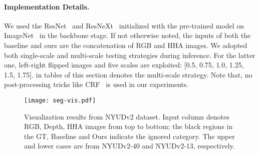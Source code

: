 \vspace{-0.6cm}
\paragraph{Implementation Details.} We used the ResNet~\cite{he2016deep} and ResNeXt~\cite{xie2017aggregated} initialized with the pre-trained model on ImageNet~\cite{russakovsky2015imagenet} in the backbone stage. If not otherwise noted, the inputs of both the baseline and ours are the concatenation of RGB and HHA images. We adopted both single-scale and multi-scale testing strategies during inference. For the latter one, left-right flipped images and five scales are exploited: [0.5, 0.75, 1.0, 1.25, 1.5, 1.75].  in tables of this section denotes the multi-scale strategy. Note that, no post-processing tricks like CRF~\cite{chen2017deeplab} is used in our experiments.

\begin{figure*}[t!]
	\centering
	\centering
	\texttt{[image: seg-vis.pdf]}
\caption{Visualization results from NYUDv2 dataset. Input column denotes RGB, Depth, HHA images from top to bottom; the black regions in the GT, Baseline and Ours indicate the ignored category. The upper and lower cases are from NYUDv2-40 and NYUDv2-13, respectively.}
	\label{fig:vis-seg}
\end{figure*}


